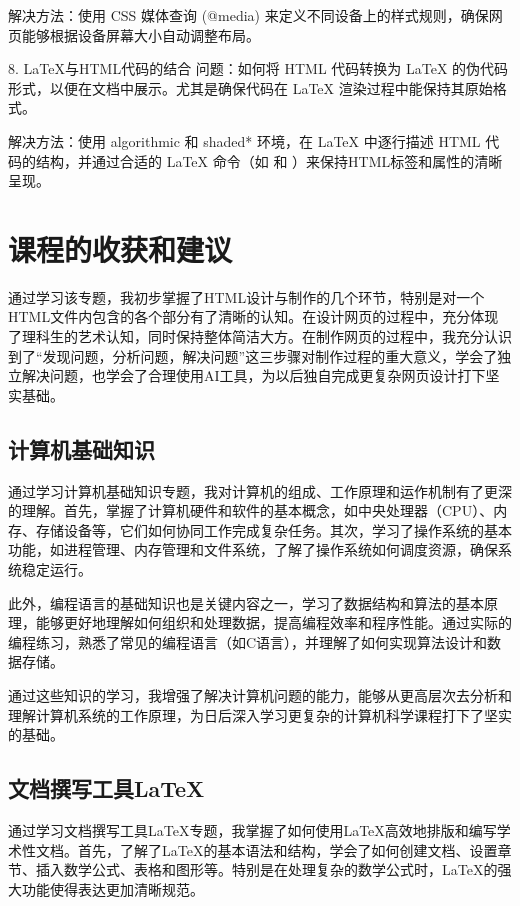 \documentclass[supercite]{Experimental_Report}
\theoremstyle{definition}
\begin{document}
   解决方法：使用 CSS 媒体查询 (@media) 来定义不同设备上的样式规则，确保网页能够根据设备屏幕大小自动调整布局。

8. LaTeX与HTML代码的结合
   问题：如何将 HTML 代码转换为 LaTeX 的伪代码形式，以便在文档中展示。尤其是确保代码在 LaTeX 渲染过程中能保持其原始格式。
   
   解决方法：使用 algorithmic 和 shaded* 环境，在 LaTeX 中逐行描述 HTML 代码的结构，并通过合适的 LaTeX 命令（如 \textbf{} 和 \texttt{}）来保持HTML标签和属性的清晰呈现。

\newpage

\section{课程的收获和建议}

通过学习该专题，我初步掌握了HTML设计与制作的几个环节，特别是对一个HTML文件内包含的各个部分有了清晰的认知。在设计网页的过程中，充分体现了理科生的艺术认知，同时保持整体简洁大方。在制作网页的过程中，我充分认识到了“发现问题，分析问题，解决问题”这三步骤对制作过程的重大意义，学会了独立解决问题，也学会了合理使用AI工具，为以后独自完成更复杂网页设计打下坚实基础。

\subsection{计算机基础知识}

通过学习计算机基础知识专题，我对计算机的组成、工作原理和运作机制有了更深的理解。首先，掌握了计算机硬件和软件的基本概念，如中央处理器（CPU）、内存、存储设备等，它们如何协同工作完成复杂任务。其次，学习了操作系统的基本功能，如进程管理、内存管理和文件系统，了解了操作系统如何调度资源，确保系统稳定运行。 

此外，编程语言的基础知识也是关键内容之一，学习了数据结构和算法的基本原理，能够更好地理解如何组织和处理数据，提高编程效率和程序性能。通过实际的编程练习，熟悉了常见的编程语言（如C语言），并理解了如何实现算法设计和数据存储。

通过这些知识的学习，我增强了解决计算机问题的能力，能够从更高层次去分析和理解计算机系统的工作原理，为日后深入学习更复杂的计算机科学课程打下了坚实的基础。

\subsection{文档撰写工具LaTeX}

通过学习文档撰写工具LaTeX专题，我掌握了如何使用LaTeX高效地排版和编写学术性文档。首先，了解了LaTeX的基本语法和结构，学会了如何创建文档、设置章节、插入数学公式、表格和图形等。特别是在处理复杂的数学公式时，LaTeX的强大功能使得表达更加清晰规范。 
\end{document}
